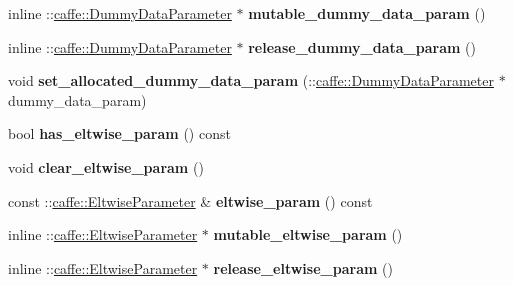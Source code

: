 \begin{DoxyCompactItemize}
\item 
\mbox{\label{classcaffe_1_1_layer_parameter_aba1fa94d09808a8d1b5cc4d843547fe5}} 
inline \+::\mbox{\hyperlink{classcaffe_1_1_dummy_data_parameter}{caffe\+::\+Dummy\+Data\+Parameter}} $\ast$ {\bfseries mutable\+\_\+dummy\+\_\+data\+\_\+param} ()
\item 
\mbox{\label{classcaffe_1_1_layer_parameter_a6e7518295de26e39d3690bec60afc913}} 
inline \+::\mbox{\hyperlink{classcaffe_1_1_dummy_data_parameter}{caffe\+::\+Dummy\+Data\+Parameter}} $\ast$ {\bfseries release\+\_\+dummy\+\_\+data\+\_\+param} ()
\item 
\mbox{\label{classcaffe_1_1_layer_parameter_a5e5dea6732572884981c4412222163de}} 
void {\bfseries set\+\_\+allocated\+\_\+dummy\+\_\+data\+\_\+param} (\+::\mbox{\hyperlink{classcaffe_1_1_dummy_data_parameter}{caffe\+::\+Dummy\+Data\+Parameter}} $\ast$dummy\+\_\+data\+\_\+param)
\item 
\mbox{\label{classcaffe_1_1_layer_parameter_a13a5aa0e6499334d78fafa0e6150d885}} 
bool {\bfseries has\+\_\+eltwise\+\_\+param} () const
\item 
\mbox{\label{classcaffe_1_1_layer_parameter_ac0b2d3f82c67df3e5394be8200a28d54}} 
void {\bfseries clear\+\_\+eltwise\+\_\+param} ()
\item 
\mbox{\label{classcaffe_1_1_layer_parameter_ad23aee00ed98461dbb817c6c465eabbb}} 
const \+::\mbox{\hyperlink{classcaffe_1_1_eltwise_parameter}{caffe\+::\+Eltwise\+Parameter}} \& {\bfseries eltwise\+\_\+param} () const
\item 
\mbox{\label{classcaffe_1_1_layer_parameter_ac77ffd6186cd2819f248e0cb5a202d39}} 
inline \+::\mbox{\hyperlink{classcaffe_1_1_eltwise_parameter}{caffe\+::\+Eltwise\+Parameter}} $\ast$ {\bfseries mutable\+\_\+eltwise\+\_\+param} ()
\item 
\mbox{\label{classcaffe_1_1_layer_parameter_a8038bae6973f2899330a90f8dcbefe68}} 
inline \+::\mbox{\hyperlink{classcaffe_1_1_eltwise_parameter}{caffe\+::\+Eltwise\+Parameter}} $\ast$ {\bfseries release\+\_\+eltwise\+\_\+param} ()

\end{DoxyCompactItemize}
